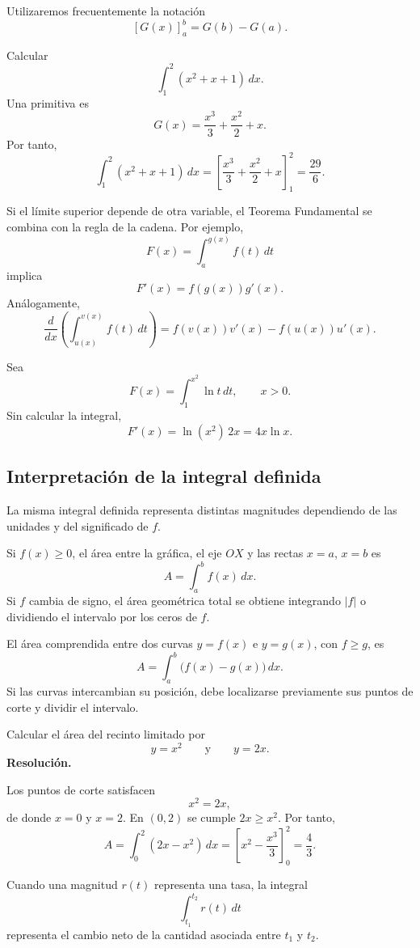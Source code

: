 Utilizaremos frecuentemente la notación
\[
\left[G(x)\right]_a^b=G(b)-G(a).
\]

\begin{example}
Calcular
\[
\int_1^2(x^2+x+1)\,dx.
\]
Una primitiva es
\[
G(x)=\frac{x^3}{3}+\frac{x^2}{2}+x.
\]
Por tanto,
\[
\int_1^2(x^2+x+1)\,dx
=
\left[\frac{x^3}{3}+\frac{x^2}{2}+x\right]_1^2
=
\frac{29}{6}.
\]
\end{example}

Si el límite superior depende de otra variable, el Teorema Fundamental se combina con la regla de la cadena. Por ejemplo,
\[
F(x)=\int_a^{g(x)}f(t)\,dt
\]
implica
\[
\boxed{F'(x)=f(g(x))g'(x).}
\]
Análogamente,
\[
\frac{d}{dx}\left(\int_{u(x)}^{v(x)}f(t)\,dt\right)
=
f(v(x))v'(x)-f(u(x))u'(x).
\]

\begin{example}
Sea
\[
F(x)=\int_1^{x^2}\ln t\,dt,
\qquad x>0.
\]
Sin calcular la integral,
\[
F'(x)=\ln(x^2)\,2x=4x\ln x.
\]
\end{example}

\subsection{Interpretación de la integral definida}

La misma integral definida representa distintas magnitudes dependiendo de las unidades y del significado de $f$.

Si $f(x)\geq0$, el área entre la gráfica, el eje $OX$ y las rectas $x=a$, $x=b$ es
\[
A=\int_a^b f(x)\,dx.
\]
Si $f$ cambia de signo, el área geométrica total se obtiene integrando $|f|$ o dividiendo el intervalo por los ceros de $f$.

El área comprendida entre dos curvas $y=f(x)$ e $y=g(x)$, con $f\geq g$, es
\[
A=\int_a^b\bigl(f(x)-g(x)\bigr)\,dx.
\]
Si las curvas intercambian su posición, debe localizarse previamente sus puntos de corte y dividir el intervalo.

\begin{solvedexercise}
Calcular el área del recinto limitado por
\[
y=x^2
\qquad\text{y}\qquad
y=2x.
\]
\tcblower
\textbf{Resolución.}\par\smallskip
Los puntos de corte satisfacen
\[
x^2=2x,
\]
de donde $x=0$ y $x=2$. En $(0,2)$ se cumple $2x\geq x^2$. Por tanto,
\[
A=\int_0^2(2x-x^2)\,dx
=
\left[x^2-\frac{x^3}{3}\right]_0^2
=
\boxed{\frac43}.
\]
\end{solvedexercise}

Cuando una magnitud $r(t)$ representa una tasa, la integral
\[
\int_{t_1}^{t_2}r(t)\,dt
\]
representa el cambio neto de la cantidad asociada entre $t_1$ y $t_2$.


